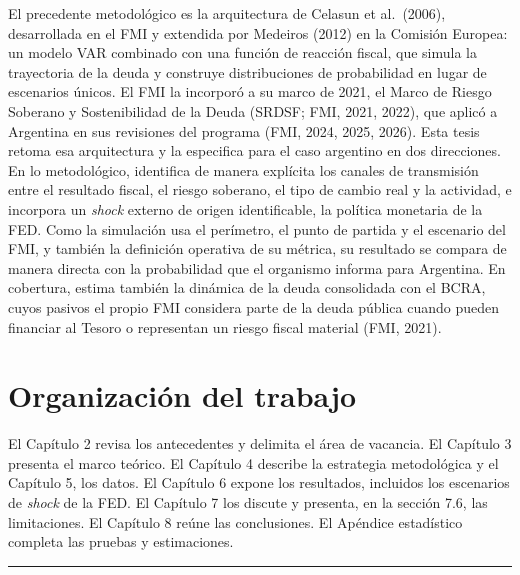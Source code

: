 El precedente metodológico es la arquitectura de Celasun et al.~(2006),
desarrollada en el FMI y extendida por Medeiros (2012) en la Comisión
Europea: un modelo VAR combinado con una función de reacción fiscal, que
simula la trayectoria de la deuda y construye distribuciones de
probabilidad en lugar de escenarios únicos. El FMI la incorporó a su
marco de 2021, el Marco de Riesgo Soberano y Sostenibilidad de la Deuda
(SRDSF; FMI, 2021, 2022), que aplicó a Argentina en sus revisiones del
programa (FMI, 2024, 2025, 2026). Esta tesis retoma esa arquitectura y
la especifica para el caso argentino en dos direcciones. En lo
metodológico, identifica de manera explícita los canales de transmisión
entre el resultado fiscal, el riesgo soberano, el tipo de cambio real y
la actividad, e incorpora un \emph{shock} externo de origen
identificable, la política monetaria de la FED. Como la simulación usa
el perímetro, el punto de partida y el escenario del FMI, y también la
definición operativa de su métrica, su resultado se compara de manera
directa con la probabilidad que el organismo informa para Argentina. En
cobertura, estima también la dinámica de la deuda consolidada con el
BCRA, cuyos pasivos el propio FMI considera parte de la deuda pública
cuando pueden financiar al Tesoro o representan un riesgo fiscal
material (FMI, 2021).

\section{Organización del trabajo}

El Capítulo 2 revisa los antecedentes y delimita el área de vacancia. El
Capítulo 3 presenta el marco teórico. El Capítulo 4 describe la
estrategia metodológica y el Capítulo 5, los datos. El Capítulo 6 expone
los resultados, incluidos los escenarios de \emph{shock} de la FED. El
Capítulo 7 los discute y presenta, en la sección 7.6, las limitaciones.
El Capítulo 8 reúne las conclusiones. El Apéndice estadístico completa
las pruebas y estimaciones.

\begin{center}\rule{0.5\linewidth}{0.5pt}\end{center}
